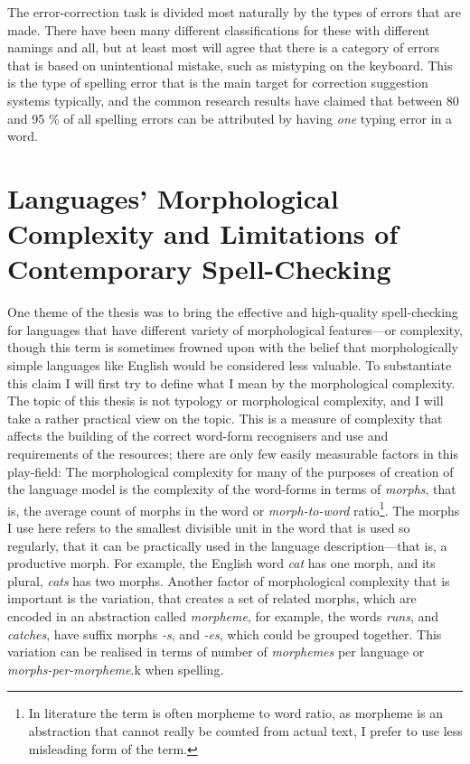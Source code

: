 \documentclass[officiallayout]{unihelcompling}
\begin{document}
The error-correction task is divided most naturally by the types of errors that
are made. There have been many different classifications for these with
different namings and all, but at least most will agree that there is a
category of errors that is based on unintentional mistake, such as
mistyping on the keyboard. This is the type of spelling error that is the
main target for correction suggestion systems typically, and the common
research results have claimed that between 80 and 95 \% of all spelling
errors can be attributed by having \emph{one} typing error in a word.



\section{Languages' Morphological Complexity and Limitations of Contemporary
Spell-Checking}
\label{sec:morphological-complexity}

One theme of the thesis was to bring the effective and high-quality
spell-checking for languages that have different variety of morphological
features---or complexity, though this term is sometimes frowned upon with the
belief that morphologically simple languages like English would be considered
less valuable. To substantiate this claim I will first try to define what I
mean by the morphological complexity. The topic of this thesis is not typology
or morphological complexity, and I will take a rather practical view on the
topic. This is a measure of complexity that affects the building of the correct
word-form recognisers and use and requirements of the resources; there are only
few easily measurable factors in this play-field: The morphological complexity
for many of the purposes of creation of the language model is the complexity of
the word-forms in terms of \emph{morphs}, that is, the average count of morphs
in the word or \emph{morph-to-word} ratio\footnote{In literature the term is
often morpheme to word ratio, as morpheme is an abstraction that cannot really
be counted from actual text, I prefer to use less misleading form of the
term.}. The morphs I use here refers to the smallest divisible unit in the word
that is used so regularly, that it can be practically used in the language
description---that is, a productive morph. For example, the English word
\emph{cat} has one morph, and its plural, \emph{cats} has two morphs.  Another
factor of morphological complexity that is important is the variation, that
creates a set of related morphs, which are encoded in an abstraction called
\emph{morpheme}, for example, the words \emph{runs}, and \emph{catches}, have
suffix morphs \emph{-s}, and \emph{-es}, which could be grouped together. This
variation can be realised in terms of number of \emph{morphemes} per language
or \emph{morphs-per-morpheme}.k when spelling.
\end{document}
